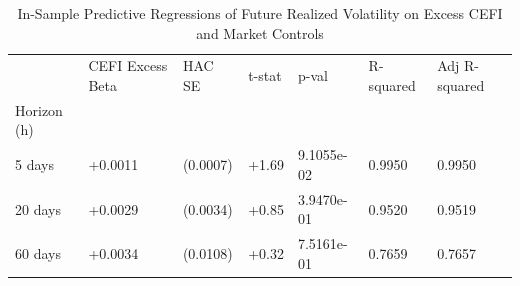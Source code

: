 \begin{table}
\caption{In-Sample Predictive Regressions of Future Realized Volatility on Excess CEFI and Market Controls}
\label{tab:predictive_reg}
\begin{tabular}{lllllll}
\toprule
 & CEFI Excess Beta & HAC SE & t-stat & p-val & R-squared & Adj R-squared \\
Horizon (h) &  &  &  &  &  &  \\
\midrule
5 days & +0.0011 & (0.0007) & +1.69 & 9.1055e-02 & 0.9950 & 0.9950 \\
20 days & +0.0029 & (0.0034) & +0.85 & 3.9470e-01 & 0.9520 & 0.9519 \\
60 days & +0.0034 & (0.0108) & +0.32 & 7.5161e-01 & 0.7659 & 0.7657 \\
\bottomrule
\end{tabular}
\end{table}
